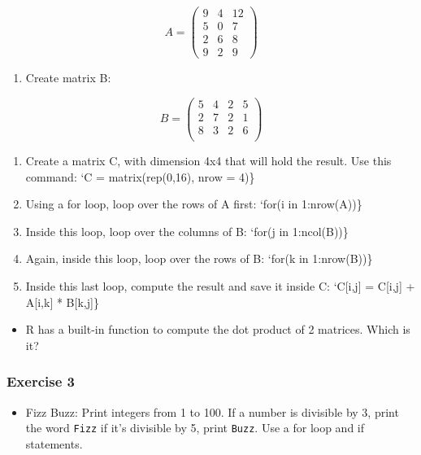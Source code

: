 \documentclass[]{gitbook}
\providecommand{\tightlist}{%
  \setlength{\itemsep}{0pt}\setlength{\parskip}{0pt}}
\theoremstyle{definition}
\theoremstyle{definition}
\theoremstyle{definition}
\theoremstyle{remark}
\begin{document}
\[A = \left(
  \begin{array}{ccc}
   9 & 4 & 12 \\
   5 & 0 & 7 \\
   2 & 6 & 8 \\
   9 & 2 & 9
  \end{array} \right)
\]

\begin{enumerate}
\def\labelenumi{\arabic{enumi})}
\setcounter{enumi}{1}
\tightlist
\item
  Create matrix B:
\end{enumerate}

\[B = \left(
\begin{array}{cccc}
 5 & 4 & 2 & 5 \\
 2 & 7 & 2 & 1 \\
 8 & 3 & 2 & 6 \\
\end{array} \right)
\]

\begin{enumerate}
\def\labelenumi{\arabic{enumi})}
\setcounter{enumi}{2}
\item
  Create a matrix C, with dimension 4x4 that will hold the result. Use
  this command: `C = matrix(rep(0,16), nrow = 4)\}
\item
  Using a for loop, loop over the rows of A first: `for(i in
  1:nrow(A))\}
\item
  Inside this loop, loop over the columns of B: `for(j in 1:ncol(B))\}
\item
  Again, inside this loop, loop over the rows of B: `for(k in
  1:nrow(B))\}
\item
  Inside this last loop, compute the result and save it inside C:
  `C{[}i,j{]} = C{[}i,j{]} + A{[}i,k{]} * B{[}k,j{]}\}
\end{enumerate}

\begin{itemize}
\tightlist
\item
  R has a built-in function to compute the dot product of 2 matrices.
  Which is it?
\end{itemize}

\hypertarget{exercise-3-3}{%
\subsubsection*{Exercise 3}\label{exercise-3-3}}

\begin{itemize}
\tightlist
\item
  Fizz Buzz: Print integers from 1 to 100. If a number is divisible by
  3, print the word \texttt{Fizz} if it's divisible by 5, print
  \texttt{Buzz}. Use a for loop and if statements.
\end{itemize}
\end{document}
